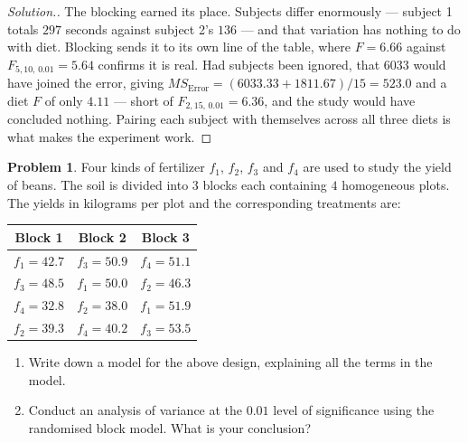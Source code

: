 \documentclass[11pt,a4paper]{article}
\theoremstyle{definition}
\newtheorem{problemx}{Problem}[section]
\newenvironment{problem}{\begin{problemx}}{\end{problemx}}
\newenvironment{solution}
  {\renewcommand{\qedsymbol}{}\begin{proof}[\textit{Solution}.]}
  {\end{proof}}
\begin{document}
\begin{solution}
The blocking earned its place. Subjects differ enormously --- subject 1 totals $297$ seconds
against subject 2's $136$ --- and that variation has nothing to do with diet. Blocking sends
it to its own line of the table, where $F=6.66$ against $F_{5,10,\,0.01}=5.64$ confirms it is
real. Had subjects been ignored, that $6033$ would have joined the error, giving
$MS_{\text{Error}}=(6033.33+1811.67)/15=523.0$ and a diet $F$ of only $4.11$ --- short of
$F_{2,15,\,0.01}=6.36$, and the study would have concluded nothing. Pairing each subject
with themselves across all three diets is what makes the experiment work.
\end{solution}

\begin{problem}
Four kinds of fertilizer $f_1$, $f_2$, $f_3$ and $f_4$ are used to study the yield of beans.
The soil is divided into $3$ blocks each containing $4$ homogeneous plots. The yields in
kilograms per plot and the corresponding treatments are:
\begin{table}[H]
\centering
\begin{tabular}{ccc}
Block 1 & Block 2 & Block 3\\
\hline
$f_1=42.7$ & $f_3=50.9$ & $f_4=51.1$\\
$f_3=48.5$ & $f_1=50.0$ & $f_2=46.3$\\
$f_4=32.8$ & $f_2=38.0$ & $f_1=51.9$\\
$f_2=39.3$ & $f_4=40.2$ & $f_3=53.5$\\
\end{tabular}
\end{table}
\begin{enumerate}
\item[(a).] Write down a model for the above design, explaining all the terms in the model.
\item[(b).] Conduct an analysis of variance at the $0.01$ level of significance using the
randomised block model. What is your conclusion?
\end{enumerate}
\end{problem}
\end{document}
